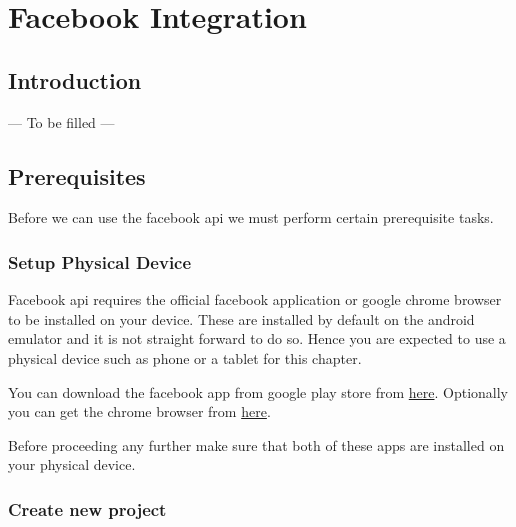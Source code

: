 \chapter{Facebook Integration}
\label{FBI}

\section{Introduction}
\label{FBI:introduction}
--- To be filled ---

\section{Prerequisites}
\label{FBI:settingUpProject}

Before we can use the facebook api we must perform certain prerequisite tasks.

\subsection{Setup Physical Device}
\label{FBI:usePhysicalDevice}
Facebook api requires the official facebook application or google chrome browser to be installed on your device. These are installed by default on the android emulator and it is not straight forward to do so. Hence you are expected to use a physical device such as phone or a tablet for this chapter. 

You can download the facebook app from google play store from \href{https://play.google.com/store/apps/details?id=com.facebook.katana&hl=en}{here}. Optionally you can get the chrome browser from \href{https://play.google.com/store/apps/details?id=com.android.chrome&hl=en}{here}.

Before proceeding any further make sure that both of these apps are installed on your physical device.

\subsection{Create new project}
\label{FBI:createProj}

